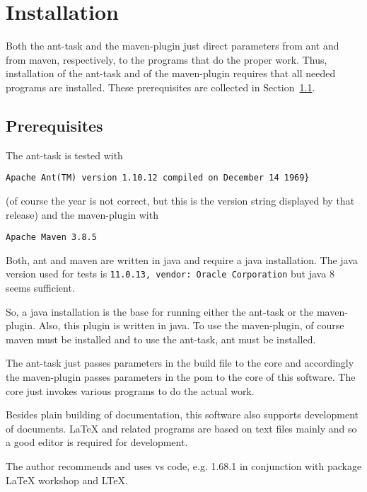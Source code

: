 
\chapter{Installation}\label{chap:install}

Both the ant-task and the maven-plugin just direct parameters 
from ant and from maven, respectively, 
to the programs that do the proper work. 
Thus, installation of the ant-task and of the maven-plugin 
requires that all needed programs are installed. 
These prerequisites are collected in Section~\ref{sec:prerequisites}. 

\section{Prerequisites}\label{sec:prerequisites}

The ant-task is tested with 
%
\begin{verbatim}
Apache Ant(TM) version 1.10.12 compiled on December 14 1969}
\end{verbatim}
%
(of course the year is not correct, but this is the version string
displayed by that release) and the maven-plugin with 
%
\begin{verbatim}
Apache Maven 3.8.5 
\end{verbatim}
%
Both, ant and maven are written in java and require a java installation. 
The java version used for tests 
is \texttt{11.0.13, vendor: Oracle Corporation}
but java 8 seems sufficient. 


So, a java installation is the base for running either the ant-task 
or the maven-plugin. 
Also, this plugin is written in java. 
To use the maven-plugin, of course maven must be installed 
and to use the ant-task, ant must be installed. 

The ant-task just passes parameters in the build file to the core 
and accordingly the maven-plugin passes parameters in the pom 
to the core of this software. 
The core just invokes various programs to do the actual work. 

Besides plain building of documentation, 
this software also supports development of documents. 
\LaTeX{} and related programs are based on text files mainly 
and so a good editor is required for development. 

The author recommends and uses vs code, e.g. 1.68.1 
in conjunction with package \LaTeX{} workshop and LTeX. 

